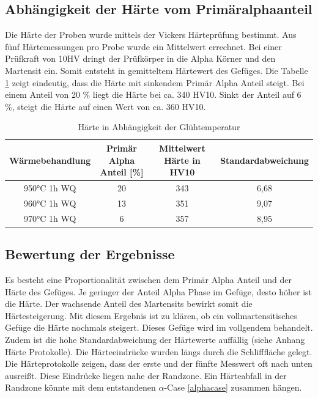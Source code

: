 \documentclass[a4paper, 11pt]{tubsreprt}
\begin{document}
\subsection{Abhängigkeit der Härte vom Primäralphaanteil}
Die Härte der Proben wurde mittels der Vickers Härteprüfung bestimmt. Aus fünf Härtemessungen pro Probe wurde ein Mittelwert errechnet. Bei einer Prüfkraft von 10HV dringt der Prüfkörper in die Alpha Körner und den Martensit ein. Somit entsteht in gemitteltem Härtewert des Gefüges. Die Tabelle \ref{Härte in Abhängigkeit der Glühtemperatur} zeigt eindeutig, dass die Härte mit sinkendem Primär Alpha Anteil steigt. Bei einem Anteil von 20 \% liegt die Härte bei ca. 340 HV10. Sinkt der Anteil auf 6 \%, steigt die Härte auf einen Wert von ca. 360 HV10.

\begin{table}	%
\begin{tabular}{c|c|c|c}
Wärmebehandlung	& Primär Alpha Anteil [\%] &	Mittelwert 
Härte in HV10 	& Standardabweichung \\
\hline
950°C 1h WQ	& 	20	&	343	&	6,68 \\
960°C 1h WQ	&	13	&	351	&	9,07 \\
970°C 1h WQ	&	6	&	357	&	8,95 \\

\end{tabular}
\caption{Härte in Abhängigkeit der Glühtemperatur}
\label{Härte in Abhängigkeit der Glühtemperatur}
\end{table}
\subsection{Bewertung der Ergebnisse}
Es besteht eine Proportionalität zwischen dem Primär Alpha Anteil und der Härte des Gefüges. Je geringer der Anteil Alpha Phase im Gefüge, desto höher ist die Härte. Der wachsende Anteil des Martensits bewirkt somit die Härtesteigerung. Mit diesem Ergebnis ist zu klären, ob ein vollmartensitisches Gefüge die Härte nochmals steigert. Dieses Gefüge wird im vollgendem behandelt.
Zudem ist die hohe Standardabweichung der Härtewerte auffällig (siehe Anhang Härte Protokolle). Die Härteeindrücke wurden längs durch die Schlifffläche gelegt. Die Härteprotokolle zeigen, dass der erste und der fünfte Messwert oft nach unten ausreißt. Diese Eindrücke liegen nahe der Randzone. Ein Härteabfall in der Randzone könnte mit dem entstandenen $\alpha$-Case \ref{alphacase} zusammen hängen.   
\end{document}
